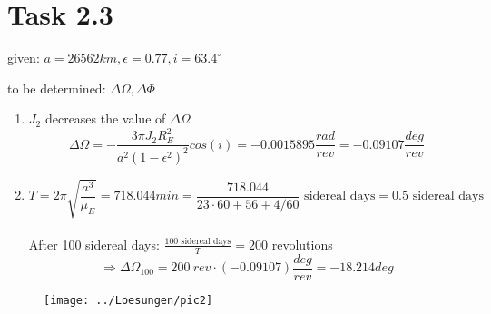 \documentclass[a4paper,12pt]{article}
\begin{document}
\section*{Task 2.3}
given: $a = 26562km, \epsilon = 0.77, i = 63.4^{\circ}$ 

\noindent to be determined: $\Delta \Omega, \Delta \Phi$

\begin{enumerate}
 \item $J_2$ decreases the value of $\Delta \Omega$ \[\Delta\Omega = -\frac{3\pi J_2R_E^2}{a^2(1-\epsilon^2)^2}cos(i) = -0.0015895 \frac{rad}{rev} = -0.09107 \frac{deg}{rev}\]
 \item \[T = 2\pi\sqrt{\frac{a^3}{\mu_E}} = 718.044 min =  \frac{718.044}{23\cdot60+56+4/60}\text{ sidereal days} = 0.5 \text{ sidereal days}\]
 \\ After 100 sidereal days: $\frac{100 \text{ sidereal days}}{T} = 200$ revolutions
 \[\Rightarrow \Delta \Omega_{100} = 200\ rev \cdot (-0.09107) \frac{deg}{rev} = -18.214 deg\]
\end{enumerate}

\begin{figure}[!ht]
 \centering
 \texttt{[image: ../Loesungen/pic2]}
\end{figure}
\end{document}
